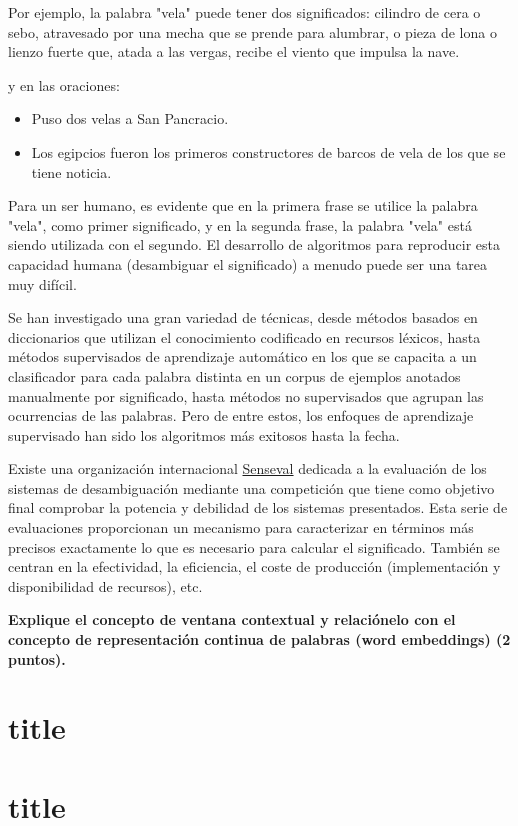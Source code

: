 \documentclass[11pt]{exam}
\begin{document}
\begin{questions}
Por ejemplo, la palabra "vela" puede tener dos significados: cilindro de cera o sebo, atravesado por una mecha que se prende para alumbrar, o pieza de lona o lienzo fuerte que, atada a las vergas, recibe el viento que impulsa la nave.

y en las oraciones:

\begin{itemize}
	\item Puso dos velas a San Pancracio.
	\item Los egipcios fueron los primeros constructores de barcos de vela de los que se tiene noticia.
\end{itemize}

Para un ser humano, es evidente que en la primera frase se utilice la palabra "vela", como primer significado, y en la segunda frase, la palabra "vela" está siendo utilizada con el segundo. El desarrollo de algoritmos para reproducir esta capacidad humana (desambiguar el significado) a menudo puede ser una tarea muy difícil.

Se han investigado una gran variedad de técnicas, desde métodos basados en diccionarios que utilizan el conocimiento codificado en recursos léxicos, hasta métodos supervisados de aprendizaje automático en los que se capacita a un clasificador para cada palabra distinta en un corpus de ejemplos anotados manualmente por significado, hasta métodos no supervisados que agrupan las ocurrencias de las palabras. Pero de entre estos, los enfoques de aprendizaje supervisado han sido los algoritmos más exitosos hasta la fecha.

Existe una organización internacional \href{http://www.senseval.org}{Senseval} dedicada a la evaluación de los sistemas de desambiguación mediante una competición que tiene como objetivo final comprobar la potencia y debilidad de los sistemas presentados. Esta serie de evaluaciones proporcionan un mecanismo para caracterizar en términos más precisos exactamente lo que es necesario para calcular el significado. También se centran en la efectividad, la eficiencia, el coste de producción (implementación y disponibilidad de recursos), etc.

{\bf \question Explique el concepto de ventana contextual y relaciónelo con el concepto de representación continua de palabras (word embeddings) (2 puntos).}

\section{title}

\section{title}
	
\end{questions}
	
\end{document}
